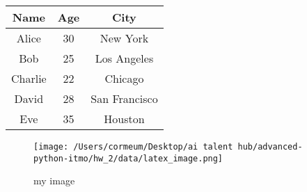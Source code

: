 \documentclass{article}
\begin{document}
\begin{tabular}{|c|c|c|}
\hline
Name & Age & City \\
\hline
Alice & 30 & New York \\
\hline
Bob & 25 & Los Angeles \\
\hline
Charlie & 22 & Chicago \\
\hline
David & 28 & San Francisco \\
\hline
Eve & 35 & Houston \\
\hline
\end{tabular}


\begin{figure}[h]
        \centering
        \texttt{[image: /Users/cormeum/Desktop/ai talent hub/advanced-python-itmo/hw\_2/data/latex\_image.png]}
        \caption{my image}
    \end{figure}
\end{document}
